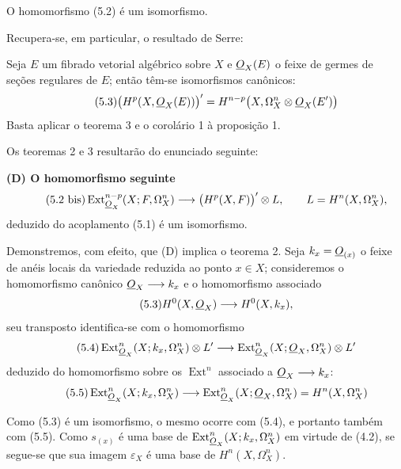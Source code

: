  O homomorfismo (5.2) é um isomorfismo.

Recupera-se, em particular, o resultado de Serre:

 Seja $E$ um fibrado vetorial algébrico sobre $X$ e
$\underline{O}_X(E)$ o feixe de germes de seções regulares de $E$; então têm-se
isomorfismos canônicos:
\begin{equation}\tag{5.3}
  \bigl(H^{p}(X,\underline{O}_X(E))\bigr)'
  =H^{n-p}\bigl(X,\Omega_X^{n}\otimes\underline{O}_X(E')\bigr)
\end{equation}
Basta aplicar o teorema 3 e o corolário 1 à proposição 1.

Os teoremas 2 e 3 resultarão do enunciado seguinte:

\noindent\textbf{(D) O homomorfismo seguinte}
\begin{equation}\tag{5.2 bis}
  \operatorname{Ext}_{\underline{O}_X}^{n-p}(X;F,\Omega_X^{n})
  \longrightarrow\bigl(H^{p}(X,F)\bigr)'\otimes L,
  \qquad L=H^{n}(X,\Omega_X^{n}),
\end{equation}
deduzido do acoplamento (5.1) é um isomorfismo.

Demonstremos, com efeito, que (D) implica o teorema 2. Seja
$k_x=\underline{O}_{(x)}$ o feixe de anéis locais da variedade reduzida ao ponto
$x\in X$; consideremos o homomorfismo canônico
$\underline{O}_X\longrightarrow k_x$ e o homomorfismo associado
\begin{equation}\tag{5.3}
  H^{0}(X,\underline{O}_X)\longrightarrow H^{0}(X,k_x),
\end{equation}
seu transposto identifica-se com o homomorfismo
\begin{equation}\tag{5.4}
  \operatorname{Ext}_{\underline{O}_X}^{n}(X;k_x,\Omega_X^{n})\otimes L'
  \longrightarrow
  \operatorname{Ext}_{\underline{O}_X}^{n}(X;\underline{O}_X,\Omega_X^{n})\otimes L'
\end{equation}
deduzido do homomorfismo sobre os $\operatorname{Ext}^{n}$ associado a
$\underline{O}_X\longrightarrow k_x$:
\begin{equation}\tag{5.5}
  \operatorname{Ext}_{\underline{O}_X}^{n}(X;k_x,\Omega_X^{n})
  \longrightarrow
  \operatorname{Ext}_{\underline{O}_X}^{n}(X;\underline{O}_X,\Omega_X^{n})
  =H^{n}(X,\Omega_X^{n})
\end{equation}

Como (5.3) é um isomorfismo, o mesmo ocorre
com (5.4), e portanto também com (5.5). Como $s_{(x)}$ é uma base de
$\operatorname{Ext}_{\underline{O}_X}^{n}(X;k_x,\Omega_X^{n})$ em virtude de (4.2), se
segue-se que sua imagem $\varepsilon_X$ é uma base de
$H^{n}(X,\Omega_X^{n})$.

